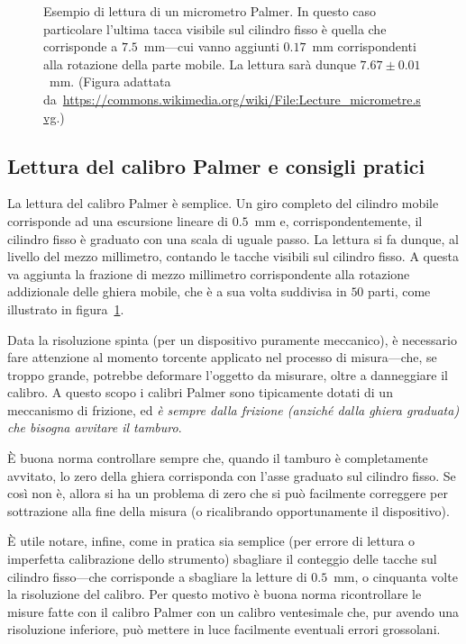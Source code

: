 \begin{figure}[!htbp]
  \centering
  \def\svgwidth{0.75\columnwidth}
  
  
  \caption{Esempio di lettura di un micrometro Palmer. In questo caso
    particolare l'ultima tacca visibile sul cilindro fisso è quella che
    corrisponde a $7.5$~mm---cui vanno aggiunti $0.17$~mm corrispondenti alla
    rotazione della parte mobile. La lettura sarà dunque $7.67 \pm 0.01$~mm.
    (Figura adattata
    da~\url{https://commons.wikimedia.org/wiki/File:Lecture_micrometre.svg}.)}
  \label{fig:micrometro}
\end{figure}


\subsection{Lettura del calibro Palmer e consigli pratici}

La lettura del calibro Palmer è semplice. Un giro completo del cilindro mobile
corrisponde ad una escursione lineare di $0.5$~mm e, corrispondentemente, il
cilindro fisso è graduato con una scala di uguale passo. La lettura si fa
dunque, al livello del mezzo millimetro, contando le tacche visibili sul
cilindro fisso. A questa va aggiunta la frazione di mezzo millimetro
corrispondente alla rotazione addizionale delle ghiera mobile, che è a sua
volta suddivisa in $50$ parti, come illustrato in figura~\ref{fig:micrometro}.

Data la risoluzione spinta (per un dispositivo puramente meccanico), è
necessario fare attenzione al momento torcente applicato nel processo di
misura---che, se troppo grande, potrebbe deformare l'oggetto da misurare, oltre
a danneggiare il calibro. A questo scopo i calibri Palmer sono tipicamente
dotati di un meccanismo di frizione, ed \emph{è sempre dalla frizione
  (anziché dalla ghiera graduata) che bisogna avvitare il tamburo}.

\`E buona norma controllare sempre che, quando il tamburo è completamente
avvitato, lo zero della ghiera corrisponda con l'asse graduato sul cilindro
fisso. Se così non è, allora si ha un problema di zero che si può
facilmente correggere per sottrazione alla fine della misura (o ricalibrando
opportunamente il dispositivo).

\`E utile notare, infine, come in pratica sia semplice (per errore di lettura
o imperfetta calibrazione dello strumento) sbagliare il conteggio delle
tacche sul cilindro fisso---che corrisponde a sbagliare la letture di $0.5$~mm,
o cinquanta volte la risoluzione del calibro. Per questo motivo è buona norma
ricontrollare le misure fatte con il calibro Palmer con un calibro ventesimale
che, pur avendo una risoluzione inferiore, può mettere in luce facilmente
eventuali errori grossolani.

